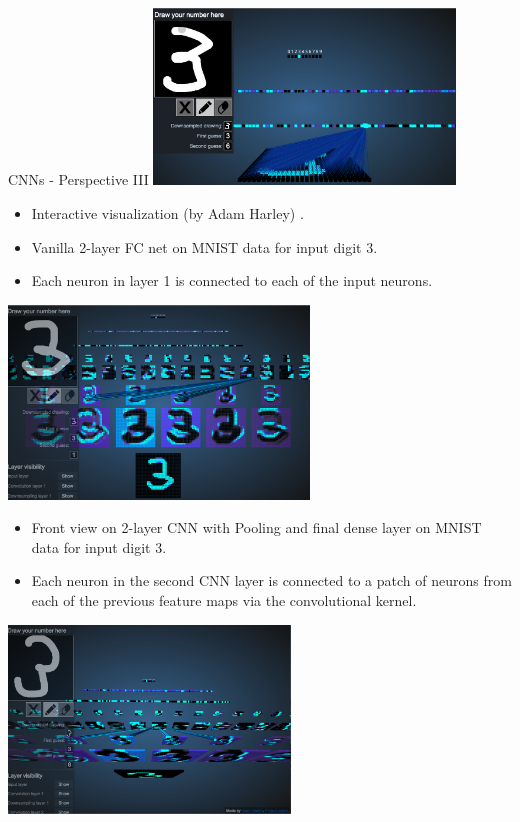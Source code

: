 \begin{vbframe}{CNNs - Perspective III}
\center
\includegraphics[width=8cm]{figure/3dviz_fcn.png}
\begin{itemize}
\item Interactive visualization (by Adam Harley)  \href{http://scs.ryerson.ca/~aharley/vis/}{}.
\item Vanilla 2-layer FC net on MNIST data for input digit $3$.
\item Each neuron in layer 1 is connected to each of the input neurons.
\end{itemize}
\framebreak
\center
\includegraphics[width=8cm]{figure/3dviz_cnn_front.png}
\begin{itemize}
\item Front view on 2-layer CNN with Pooling and final dense layer on MNIST data for input digit $3$.
\item Each neuron in the second CNN layer is connected to a patch of neurons from each of the previous feature maps via the convolutional kernel.
\end{itemize}
\framebreak
\center
\includegraphics[width=7.5cm]{figure/3dviz_cnn_bottom.png}

\end{vbframe}
